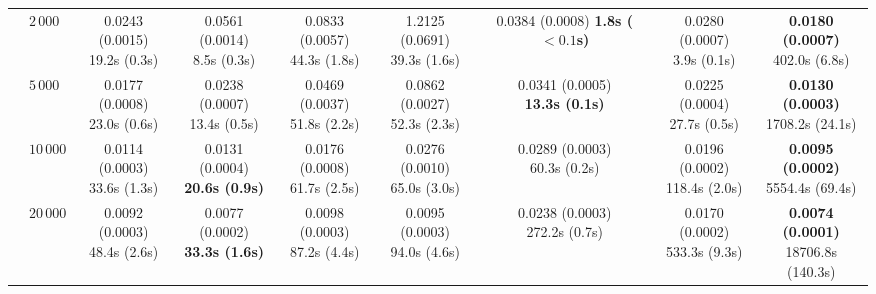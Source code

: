 \begin{table}[htbp]
{\begin{tabular}{llccccccc}
 & $2{\,}000$ & \makecell{0.0243 (0.0015) \\ \scriptsize 19.2s (0.3s)} & \makecell{0.0561 (0.0014) \\ \scriptsize 8.5s (0.3s)} & \makecell{0.0833 (0.0057) \\ \scriptsize 44.3s (1.8s)} & \makecell{1.2125 (0.0691) \\ \scriptsize 39.3s (1.6s)} & \makecell{0.0384 (0.0008) \\ \scriptsize \textbf{1.8s ($\boldsymbol{{<}0.1}$s)}} & \makecell{0.0280 (0.0007) \\ \scriptsize 3.9s (0.1s)} & \makecell{\textbf{0.0180 (0.0007)} \\ \scriptsize 402.0s (6.8s)} \\
 & $5{\,}000$ & \makecell{0.0177 (0.0008) \\ \scriptsize 23.0s (0.6s)} & \makecell{0.0238 (0.0007) \\ \scriptsize 13.4s (0.5s)} & \makecell{0.0469 (0.0037) \\ \scriptsize 51.8s (2.2s)} & \makecell{0.0862 (0.0027) \\ \scriptsize 52.3s (2.3s)} & \makecell{0.0341 (0.0005) \\ \scriptsize \textbf{13.3s (0.1s)}} & \makecell{0.0225 (0.0004) \\ \scriptsize 27.7s (0.5s)} & \makecell{\textbf{0.0130 (0.0003)} \\ \scriptsize 1708.2s (24.1s)} \\
 & $10{\,}000$ & \makecell{0.0114 (0.0003) \\ \scriptsize 33.6s (1.3s)} & \makecell{0.0131 (0.0004) \\ \scriptsize \textbf{20.6s (0.9s)}} & \makecell{0.0176 (0.0008) \\ \scriptsize 61.7s (2.5s)} & \makecell{0.0276 (0.0010) \\ \scriptsize 65.0s (3.0s)} & \makecell{0.0289 (0.0003) \\ \scriptsize 60.3s (0.2s)} & \makecell{0.0196 (0.0002) \\ \scriptsize 118.4s (2.0s)} & \makecell{\textbf{0.0095 (0.0002)} \\ \scriptsize 5554.4s (69.4s)} \\
 & $20{\,}000$ & \makecell{0.0092 (0.0003) \\ \scriptsize 48.4s (2.6s)} & \makecell{0.0077 (0.0002) \\ \scriptsize \textbf{33.3s (1.6s)}} & \makecell{0.0098 (0.0003) \\ \scriptsize 87.2s (4.4s)} & \makecell{0.0095 (0.0003) \\ \scriptsize 94.0s (4.6s)} & \makecell{0.0238 (0.0003) \\ \scriptsize 272.2s (0.7s)} & \makecell{0.0170 (0.0002) \\ \scriptsize 533.3s (9.3s)} & \makecell{\textbf{0.0074 (0.0001)} \\ \scriptsize 18706.8s (140.3s)} \\

\end{tabular}}
\end{table}
